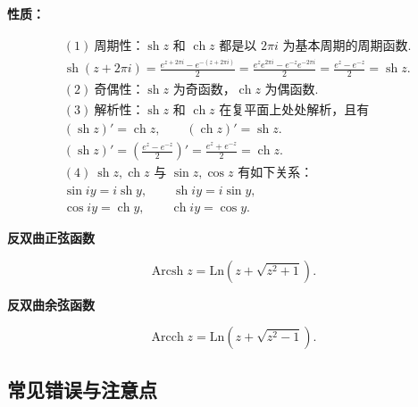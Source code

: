 \textbf{性质：}

\[
\begin{aligned}
&(1)\ \text{周期性：}\operatorname{sh}z\text{ 和 }\operatorname{ch}z\text{ 都是以 }2\pi i\text{ 为基本周期的周期函数}.\\
&\operatorname{sh}(z+2\pi i)=\frac{e^{z+2\pi i}-e^{-(z+2\pi i)}}{2}
=\frac{e^ze^{2\pi i}-e^{-z}e^{-2\pi i}}{2}
=\frac{e^z-e^{-z}}{2}=\operatorname{sh}z.\\
&(2)\ \text{奇偶性：}\operatorname{sh}z\text{ 为奇函数，}\operatorname{ch}z\text{ 为偶函数}.\\
&(3)\ \text{解析性：}\operatorname{sh}z\text{ 和 }\operatorname{ch}z\text{ 在复平面上处处解析，且有}\\
&(\operatorname{sh}z)'=\operatorname{ch}z,\qquad (\operatorname{ch}z)'=\operatorname{sh}z.\\
&(\operatorname{sh}z)'=\left(\frac{e^z-e^{-z}}{2}\right)'=\frac{e^z+e^{-z}}{2}=\operatorname{ch}z.\\
&(4)\ \operatorname{sh}z,\operatorname{ch}z\text{ 与 }\sin z,\cos z\text{ 有如下关系：}\\
&\sin iy=i\operatorname{sh}y,\qquad \operatorname{sh}iy=i\sin y,\\
&\cos iy=\operatorname{ch}y,\qquad \operatorname{ch}iy=\cos y.
\end{aligned}
\]

\textbf{反双曲正弦函数}

\[
\operatorname{Arcsh}z=\mathrm{Ln}\left(z+\sqrt{z^2+1}\right).
\]

\textbf{反双曲余弦函数}

\[
\operatorname{Arcch}z=\mathrm{Ln}\left(z+\sqrt{z^2-1}\right).
\]

\subsection{常见错误与注意点}\label{ux5e38ux89c1ux9519ux8befux4e0eux6ce8ux610fux70b9-6}

